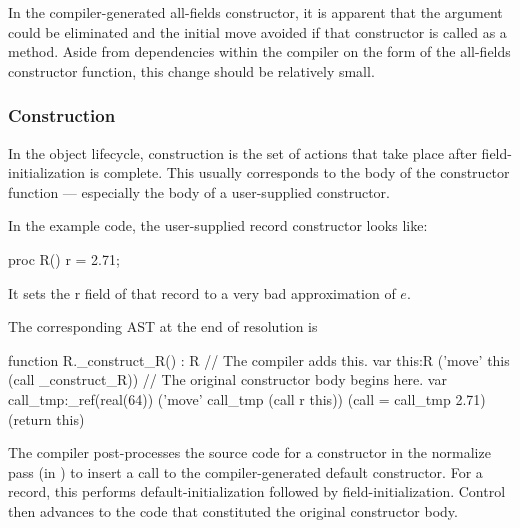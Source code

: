 In the compiler-generated all-fields constructor, it is apparent that the 
argument could be eliminated and the initial move avoided if that constructor is called as
a method.  Aside from dependencies within the compiler on the form of the all-fields
constructor function, this change should be relatively small.

\subsubsection{Construction}

In the object lifecycle, construction is the set of actions that take place after
field-initialization is complete.  This usually corresponds to the body of the constructor
function --- especially the body of a user-supplied constructor.

In the example code, the user-supplied record constructor looks like:
\begin{chapel}
  proc R() { r = 2.71; }
\end{chapel}
It sets the r field of that record to a very bad approximation of $e$.

The corresponding AST at the end of resolution is
\begin{chapelcode}
  function R._construct_R() : R
  {
    // The compiler adds this.
    var this:R
    ('move' this (call _construct_R))
    // The original constructor body begins here.
    var call_tmp:_ref(real(64))
    ('move' call_tmp (call r this))
    (call = call_tmp 2.71)
    (return this)
  }
\end{chapelcode}

The compiler post-processes the source code for a constructor in the normalize pass (in
) to insert a call to the compiler-generated default
constructor.  For a record, this performs default-initialization followed by
field-initialization.  Control then advances to the code that constituted the original
constructor body.

